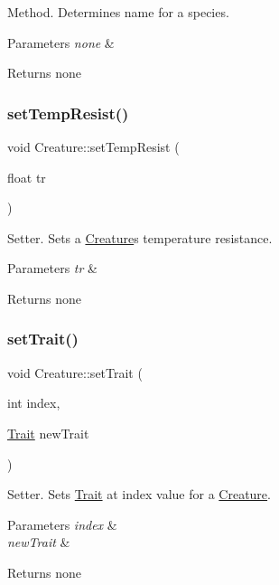 Method. Determines name for a species. 
\begin{DoxyParams}{Parameters}
{\em none} & \\
\hline
\end{DoxyParams}
\begin{DoxyReturn}{Returns}
none 
\end{DoxyReturn}
\mbox{\label{class_creature_a7e34bf01307d2818cf51f184237a62b8}} 
\subsubsection{\texorpdfstring{set\+Temp\+Resist()}{setTempResist()}}
{\footnotesize\ttfamily void Creature\+::set\+Temp\+Resist (\begin{DoxyParamCaption}\item[{float}]{tr }\end{DoxyParamCaption})}

Setter. Sets a \hyperlink{class_creature}{Creature}\textquotesingle{}s temperature resistance. 
\begin{DoxyParams}{Parameters}
{\em tr} & \\
\hline
\end{DoxyParams}
\begin{DoxyReturn}{Returns}
none 
\end{DoxyReturn}
\mbox{\label{class_creature_a5e9314c792471d371c9255567c7f57f6}} 
\subsubsection{\texorpdfstring{set\+Trait()}{setTrait()}}
{\footnotesize\ttfamily void Creature\+::set\+Trait (\begin{DoxyParamCaption}\item[{int}]{index,  }\item[{\hyperlink{class_trait}{Trait}}]{new\+Trait }\end{DoxyParamCaption})}

Setter. Sets \hyperlink{class_trait}{Trait} at index value for a \hyperlink{class_creature}{Creature}. 
\begin{DoxyParams}{Parameters}
{\em index} & \\
\hline
{\em new\+Trait} & \\
\hline
\end{DoxyParams}
\begin{DoxyReturn}{Returns}
none 
\end{DoxyReturn}
\mbox{\label{class_creature_a61b42a4c3fe592a559ccfcef5089d676}} 
